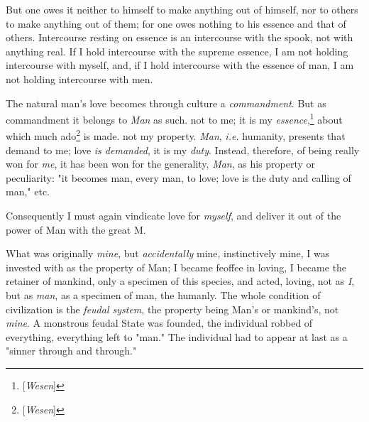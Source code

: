 \documentclass[a4paper]{book}
\begin{document}
But one owes it neither to himself to make anything out of himself, nor to 
others to make anything out of them; for one owes nothing to his essence and 
that of others. Intercourse resting on essence is an intercourse with the 
spook, not with anything real. If I hold intercourse with the supreme essence, 
I am not holding intercourse with myself, and, if I hold intercourse with the 
essence of man, I am not holding intercourse with men.

The natural man's love becomes through culture a \textit{commandment}. But as 
commandment it belongs to \textit{Man} as such. not to me; it is my 
\textit{essence},\footnote{[\textit{Wesen}]} about which much 
ado\footnote{[\textit{Wesen}]} is made. not my property. \textit{Man}, 
\textit{i.e.} humanity, presents that demand to me; love \textit{is demanded}, 
it is my \textit{duty}. Instead, therefore, of being really won for 
\textit{me}, it has been won for the generality, \textit{Man}, as his property 
or peculiarity: "{}it becomes man, every man, to love; love is the duty and 
calling of man,"{} etc.

Consequently I must again vindicate love for \textit{myself}, and deliver it 
out of the power of Man with the great M.

What was originally \textit{mine}, but \textit{accidentally} mine, 
instinctively mine, I was invested with as the property of Man; I became 
feoffee in loving, I became the retainer of mankind, only a specimen of this 
species, and acted, loving, not as \textit{I}, but as \textit{man}, as a 
specimen of man, the humanly. The whole condition of civilization is the 
\textit{feudal system}, the property being Man's or mankind's, not 
\textit{mine}. A monstrous feudal State was founded, the individual robbed of 
everything, everything left to "{}man."{} The individual had to appear at last 
as a "{}sinner through and through."{}
\end{document}
